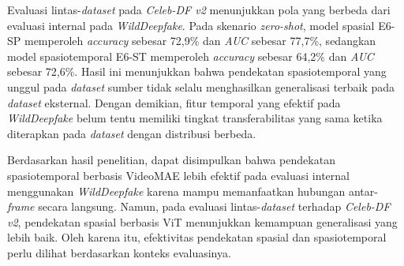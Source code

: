 \begin{center}
	Evaluasi lintas-\textit{dataset} pada \textit{Celeb-DF v2} menunjukkan pola yang berbeda dari evaluasi internal pada \textit{WildDeepfake}. Pada skenario \textit{zero-shot}, model spasial E6-SP memperoleh \textit{accuracy} sebesar 72,9\% dan \textit{AUC} sebesar 77,7\%, sedangkan model spasiotemporal E6-ST memperoleh \textit{accuracy} sebesar 64,2\% dan \textit{AUC} sebesar 72,6\%. Hasil ini menunjukkan bahwa pendekatan spasiotemporal yang unggul pada \textit{dataset} sumber tidak selalu menghasilkan generalisasi terbaik pada \textit{dataset} eksternal. Dengan demikian, fitur temporal yang efektif pada \textit{WildDeepfake} belum tentu memiliki tingkat transferabilitas yang sama ketika diterapkan pada \textit{dataset} dengan distribusi berbeda. \par

	Berdasarkan hasil penelitian, dapat disimpulkan bahwa pendekatan spasiotemporal berbasis VideoMAE lebih efektif pada evaluasi internal menggunakan \textit{WildDeepfake} karena mampu memanfaatkan hubungan antar-\textit{frame} secara langsung. Namun, pada evaluasi lintas-\textit{dataset} terhadap \textit{Celeb-DF v2}, pendekatan spasial berbasis ViT menunjukkan kemampuan generalisasi yang lebih baik. Oleh karena itu, efektivitas pendekatan spasial dan spasiotemporal perlu dilihat berdasarkan konteks evaluasinya. \par

	\vfill
	
\end{center}
\clearpage
